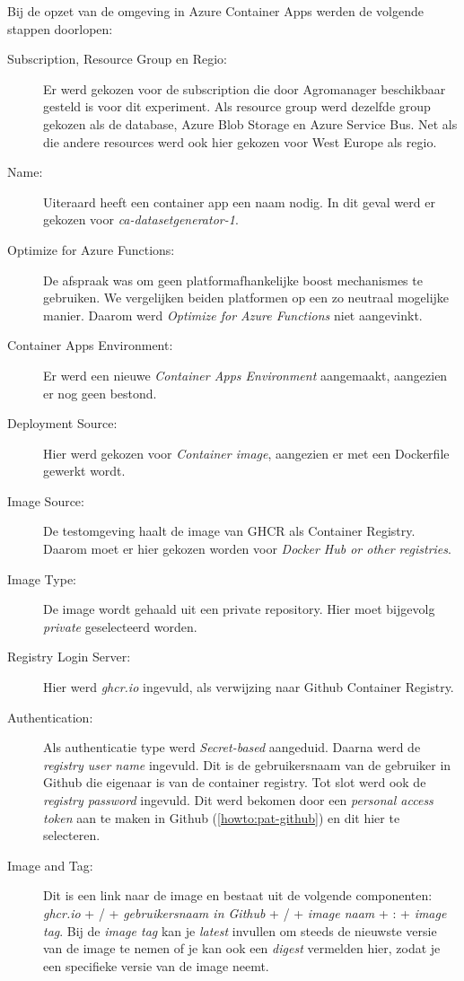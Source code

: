 Bij de opzet van de omgeving in Azure Container Apps werden de volgende stappen doorlopen:

\begin{description}
    \item[Subscription, Resource Group en Regio:] 
    Er werd gekozen voor de subscription die door Agromanager beschikbaar gesteld is voor dit experiment. Als resource group werd dezelfde group gekozen als de database, Azure Blob Storage en Azure Service Bus. Net als die andere resources werd ook hier gekozen voor West Europe als regio.
    \item[Name:] 
    Uiteraard heeft een container app een naam nodig. In dit geval werd er gekozen voor \textit{ca-datasetgenerator-1}.
    \item[Optimize for Azure Functions:] 
    De afspraak was om geen platformafhankelijke boost mechanismes te gebruiken. We vergelijken beiden platformen op een zo neutraal mogelijke manier. Daarom werd \textit{Optimize for Azure Functions} niet aangevinkt.
    \item[Container Apps Environment:] 
    Er werd een nieuwe \textit{Container Apps Environment} aangemaakt, aangezien er nog geen bestond.
    \item[Deployment Source:] 
    Hier werd gekozen voor \textit{Container image}, aangezien er met een Dockerfile gewerkt wordt.
    \item[Image Source:] 
    De testomgeving haalt de image van GHCR als Container Registry. Daarom moet er hier gekozen worden voor \textit{Docker Hub or other registries}.
    \item[Image Type:] 
    De image wordt gehaald uit een private repository. Hier moet bijgevolg \textit{private} geselecteerd worden.
    \item[Registry Login Server:] 
    Hier werd \textit{ghcr.io} ingevuld, als verwijzing naar Github Container Registry.
    \item[Authentication:] 
    Als authenticatie type werd \textit{Secret-based} aangeduid. Daarna werd de \textit{registry user name} ingevuld. Dit is de gebruikersnaam van de gebruiker in Github die eigenaar is van de container registry. Tot slot werd ook de \textit{registry password} ingevuld. Dit werd bekomen door een \textit{personal access token} aan te maken in Github (\ref{howto:pat-github}) en dit hier te selecteren.
    \item[Image and Tag:] 
    Dit is een link naar de image en bestaat uit de volgende componenten: \textit{ghcr.io} + / + \textit{gebruikersnaam in Github} + / + \textit{image naam} + : + \textit{image tag}. Bij de \textit{image tag} kan je \textit{latest} invullen om steeds de nieuwste versie van de image te nemen of je kan ook een \textit{digest} vermelden hier, zodat je een specifieke versie van de image neemt.

\end{description}
